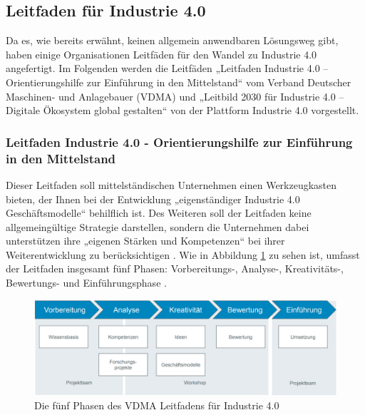 \subsection{Leitfaden für Industrie 4.0}\label{sec:LeitfadenUmsetung}
Da es, wie bereits erwähnt, keinen allgemein anwendbaren Lösungsweg gibt, haben einige Organisationen Leitfäden für den Wandel zu Industrie 4.0 angefertigt. Im Folgenden werden die Leitfäden „Leitfaden Industrie 4.0 – Orientierungshilfe zur Einführung in den Mittelstand“ vom Verband Deutscher Maschinen- und Anlagebauer (VDMA) und „Leitbild 2030 für Industrie 4.0 – Digitale Ökosystem global gestalten“ von der Plattform Industrie 4.0 vorgestellt.

\subsubsection{Leitfaden Industrie 4.0 - Orientierungshilfe zur Einführung in den Mittelstand}\label{sec:VDMALeitfaden}
Dieser Leitfaden soll mittelständischen Unternehmen einen Werkzeugkasten bieten, der Ihnen bei der Entwicklung „eigenständiger Industrie 4.0 Geschäftsmodelle“ \cite[S.6]{2} behilflich ist. Des Weiteren soll der Leitfaden keine allgemeingültige Strategie darstellen, sondern die Unternehmen dabei unterstützen ihre „eigenen Stärken und Kompetenzen“ \cite[S.6]{2} bei ihrer Weiterentwicklung zu berücksichtigen \cite[S.6]{2}. Wie in Abbildung \ref{fig:VDMAAufbauLeitfaden} zu sehen ist, umfasst der Leitfaden insgesamt fünf Phasen: Vorbereitungs-, Analyse-, Kreativitäts-, Bewertungs- und Einführungsphase \cite[S.6]{2}.
\begin{figure}[h]
	\centering
	\includegraphics[width=1\linewidth]{Bilder/A5_VDMA_Phasen}
	\caption{Die fünf Phasen des VDMA Leitfadens für Industrie 4.0 \cite[S.10]{2}}
	\label{fig:VDMAAufbauLeitfaden}
\end{figure}

